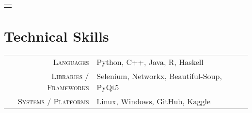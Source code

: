 \documentclass[a4paper,10pt]{extarticle} %
\begin{document}
\begin{tabular}{p{19.7cm}}
\begin{description}[style=nextline, font=$\bullet$\hspace{2mm}\normalsize]
 


\end{description}
\end{tabular}

\vspace{-0.6cm}
\section{\textcolor{primary}{Technical Skills}}

\begin{tabular}{r|p{15cm}}
\textsc{Languages} &  Python, C++, Java, R, Haskell \\
\textsc{Libraries / Frameworks} & Selenium, Networkx, Beautiful-Soup, PyQt5\\
\textsc{Systems / Platforms} &  Linux, Windows, GitHub, Kaggle \\
\end{tabular}
\end{document}
